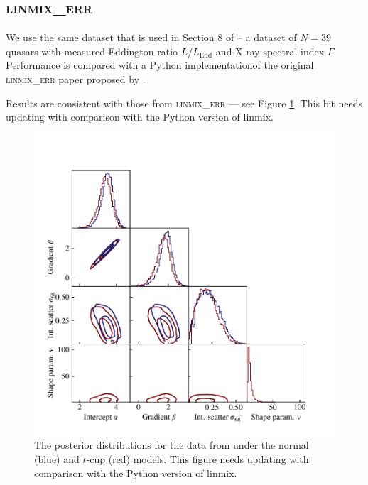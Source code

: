 \documentclass[fleqn,usenatbib]{mnras}
\begin{document}
\subsection{\textsc{linmix\_err}}

We use the same dataset that is used in Section 8 of \citet{Kelly:2007} -- a
dataset of $N = 39$ quasars with measured Eddington ratio $L / L_{\text{Edd}}$
and X-ray spectral index $\Gamma$. Performance is compared with a Python
implementation\footnotemark of the original \textsc{linmix\_err} paper proposed
by \citeauthor{Kelly:2007}.


Results are consistent with those from \textsc{linmix\_err} --- see Figure
\ref{fig:real-world.kelly.corner}. {\color{red} This bit needs updating with
comparison with the Python version of linmix.}

\begin{figure}
    \includegraphics[width=\columnwidth]{graphics/corner_kelly.pdf}
    \caption{The posterior distributions for the data from \citet{Kelly:2007}
    under the normal (blue) and $t$-cup (red) models. {\color{red} This figure
    needs updating with comparison with the Python version of linmix.}}
    \label{fig:real-world.kelly.corner}
\end{figure}
\end{document}
